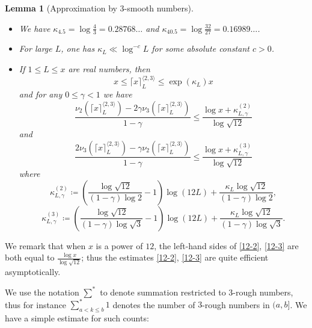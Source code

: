 \documentclass[10pt,a4paper,reqno]{amsart}
\numberwithin{equation}{section}
\theoremstyle{plain}
\newtheorem{lemma}[lemma]{Lemma}
\theoremstyle{definition}
\begin{document}
\begin{lemma}[Approximation by $3$-smooth numbers]\label{power-lemma}\
\begin{itemize}
\item[(i)]  We have $\kappa_{4.5} = \log\frac{4}{3} = 0.28768\dots$ and $\kappa_{40.5} = \log \frac{32}{27} = 0.16989\dots$.
\item[(ii)]  For large $L$, one has $\kappa_L \ll \log^{-c} L$ for some absolute constant $c>0$.
\item[(iii)]  If $1 \leq L \leq x$ are real numbers, then
\begin{equation}\label{mod-kappa}
  x \leq \lceil x \rceil^{\langle 2,3\rangle}_L \leq \exp(\kappa_L) x
\end{equation}
and for any $0 \leq \gamma < 1$ we have
\begin{equation}\label{12-2}
\frac{\nu_2(\lceil x \rceil^{\langle 2,3\rangle}_L) - 2 \gamma \nu_3(\lceil x \rceil^{\langle 2,3\rangle}_L)}{1-\gamma} \leq \frac{\log x  + \kappa^{(2)}_{L,\gamma} }{\log \sqrt{12}}
\end{equation}
and
\begin{equation}\label{12-3}
\frac{2\nu_3(\lceil x \rceil^{\langle 2,3\rangle}_L) - \gamma \nu_2(\lceil x \rceil^{\langle 2,3\rangle}_L)}{1-\gamma} \leq \frac{\log x + \kappa^{(3)}_{L,\gamma} }{\log \sqrt{12}}
\end{equation}
where
\begin{equation}\label{kappastar-2-def}
\kappa^{(2)}_{L,\gamma} \coloneqq \left(\frac{\log \sqrt{12}}{(1-\gamma)\log 2} - 1\right) \log(12L) + \frac{\kappa_L\log \sqrt{12}}{(1-\gamma) \log 2},
\end{equation}
\begin{equation}\label{kappastar-3-def}
  \kappa^{(3)}_{L,\gamma} \coloneqq \left(\frac{\log \sqrt{12}}{(1-\gamma)\log \sqrt{3}} - 1\right) \log(12L) + \frac{\kappa_L\log \sqrt{12}}{(1-\gamma)\log \sqrt{3}}.
\end{equation}
\end{itemize}
\end{lemma}

We remark that when $x$ is a power of $12$, the left-hand sides of \eqref{12-2}, \eqref{12-3} are both equal to $\frac{\log x}{\log \sqrt{12}}$; thus the estimates \eqref{12-2}, \eqref{12-3} are quite efficient asymptotically.

We use the notation $\sum^*$ to denote summation restricted to $3$-rough numbers, thus for instance $\sum_{a < k \leq b}^* 1$ denotes the number of $3$-rough numbers in $(a,b]$.  We have a simple estimate for such counts:
\end{document}
